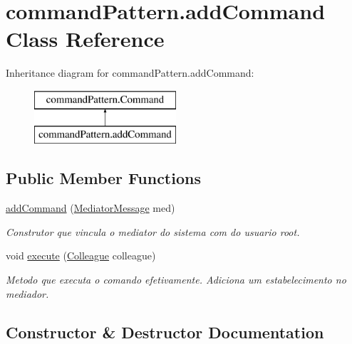\hypertarget{classcommand_pattern_1_1add_command}{}\section{command\+Pattern.\+add\+Command Class Reference}
\label{classcommand_pattern_1_1add_command}
Inheritance diagram for command\+Pattern.\+add\+Command\+:\begin{figure}[H]
\begin{center}
\leavevmode
\includegraphics[height=2.000000cm]{classcommand_pattern_1_1add_command}
\end{center}
\end{figure}
\subsection*{Public Member Functions}
\begin{DoxyCompactItemize}
\item 
\mbox{\hyperlink{classcommand_pattern_1_1add_command_a984c7e6acb7afd77bf81f34a6c3eee93}{add\+Command}} (\mbox{\hyperlink{classmediator_pattern_1_1_mediator_message}{Mediator\+Message}} med)
\begin{DoxyCompactList}\small\item\em Construtor que vincula o mediator do sistema com do usuario root. \end{DoxyCompactList}\item 
void \mbox{\hyperlink{classcommand_pattern_1_1add_command_a9d870d379fb2f882910b97ca19fe159c}{execute}} (\mbox{\hyperlink{classmediator_pattern_1_1_colleague}{Colleague}} colleague)
\begin{DoxyCompactList}\small\item\em Metodo que executa o comando efetivamente. Adiciona um estabelecimento no mediador. \end{DoxyCompactList}\end{DoxyCompactItemize}


\subsection{Constructor \& Destructor Documentation}
\mbox{\label{classcommand_pattern_1_1add_command_a984c7e6acb7afd77bf81f34a6c3eee93}} 
